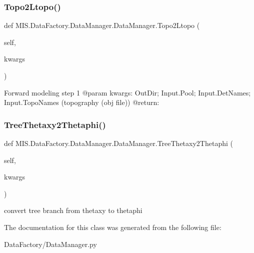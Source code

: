 \subsubsection{\texorpdfstring{Topo2\+Ltopo()}{Topo2Ltopo()}}
{\footnotesize\ttfamily def M\+I\+S.\+Data\+Factory.\+Data\+Manager.\+Data\+Manager.\+Topo2\+Ltopo (\begin{DoxyParamCaption}\item[{}]{self,  }\item[{}]{kwargs }\end{DoxyParamCaption})}

\begin{DoxyVerb}Forward modeling step 1
@param kwargs: OutDir; Input.Pool; Input.DetNames; Input.TopoNames (topography (obj file))
@return:
\end{DoxyVerb}
 \mbox{\label{classMIS_1_1DataFactory_1_1DataManager_1_1DataManager_a74abd8a0ce2581e3a3a1373e932ea1d0}} 
\subsubsection{\texorpdfstring{Tree\+Thetaxy2\+Thetaphi()}{TreeThetaxy2Thetaphi()}}
{\footnotesize\ttfamily def M\+I\+S.\+Data\+Factory.\+Data\+Manager.\+Data\+Manager.\+Tree\+Thetaxy2\+Thetaphi (\begin{DoxyParamCaption}\item[{}]{self,  }\item[{}]{kwargs }\end{DoxyParamCaption})}

\begin{DoxyVerb}convert tree branch from thetaxy to thetaphi\end{DoxyVerb}
 

The documentation for this class was generated from the following file\+:\begin{DoxyCompactItemize}
\item 
Data\+Factory/Data\+Manager.\+py\end{DoxyCompactItemize}
